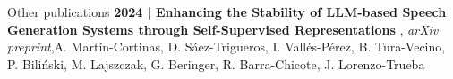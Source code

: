 \documentclass{resume} %
\begin{document}
\vspace{5pt}

\begin{rSection}{Other publications}
{\textbf{{2024} $|$ Enhancing the Stability of LLM-based Speech Generation Systems through Self-Supervised Representations }, \textit{arXiv preprint},A. Martín-Cortinas, D. Sáez-Trigueros, I. Vallés-Pérez, B. Tura-Vecino, P. Biliński, M. Lajszczak, G. Beringer, R. Barra-Chicote, J. Lorenzo-Trueba}
\end{rSection}

\vspace{\fill}
\end{document}
